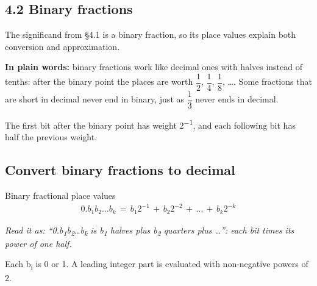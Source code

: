 \documentclass[11pt]{article}
\begin{document}
\begin{keepsection}
\section{4.2 Binary fractions}

The significand from §4.1 is a binary fraction, so its place values explain both conversion and approximation.

\begin{plainbox}\textbf{In plain words:} binary fractions work like decimal ones with halves instead of tenths: after the binary point the places are worth {\small\ensuremath{\dfrac{1}{2}}}, {\small\ensuremath{\dfrac{1}{4}}}, {\small\ensuremath{\dfrac{1}{8}}}, …. Some fractions that are short in decimal never end in binary, just as {\small\ensuremath{\dfrac{1}{3}}} never ends in decimal.\end{plainbox}

The first bit after the binary point has weight 2\textsuperscript{\ensuremath{-}1}, and each following bit has half the previous weight.

\begin{keepsection}
\subsection{Convert binary fractions to decimal}

\begin{equationcard}{Binary fractional place values}
\[ \begin{gathered} 0.{b}_{1}{b}_{2}…{b}_{{k}}\, =\, {b}_{1}2^{-1}\, +\, {b}_{2}2^{-2}\, +\, …\, +\, {b}_{{k}}2^{-{k}} \end{gathered} \]
{\small \emph{Read it as: “0.b\textsubscript{1}b\textsubscript{2}…b\textsubscript{k} is b\textsubscript{1} halves plus b\textsubscript{2} quarters plus …”: each bit times its power of one half.}\par Each b\textsubscript{i} is 0 or 1. A leading integer part is evaluated with non-negative powers of 2.}
\end{equationcard}


\end{keepsection}
\end{keepsection}
\end{document}
